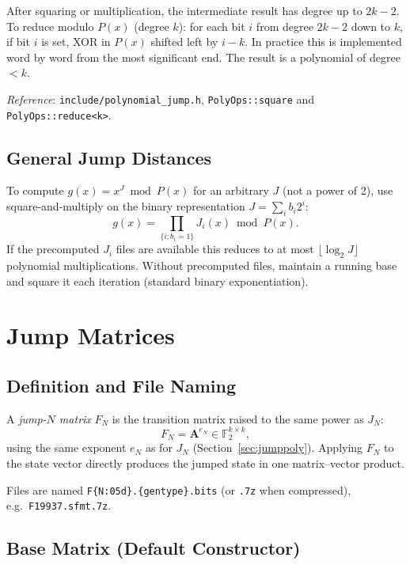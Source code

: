 \documentclass{article}
\begin{document}
After squaring or multiplication, the intermediate result has degree up to $2k-2$.
To reduce modulo $P(x)$ (degree $k$): for each bit $i$ from degree $2k-2$ down to $k$,
if bit $i$ is set, XOR in $P(x)$ shifted left by $i-k$.  In practice this is implemented
word by word from the most significant end.  The result is a polynomial of degree $< k$.

\noindent\textit{Reference}: \texttt{include/polynomial\_jump.h}, \texttt{PolyOps::square}
and \texttt{PolyOps::reduce<k>}.

\subsection{General Jump Distances}

To compute $g(x) = x^J \bmod P(x)$ for an arbitrary $J$ (not a power of 2), use
square-and-multiply on the binary representation $J = \sum_{i} b_i 2^i$:
\begin{equation}
  g(x) = \prod_{\{i : b_i = 1\}} J_i(x) \bmod P(x).
\end{equation}
If the precomputed $J_i$ files are available this reduces to at most $\lfloor\log_2 J\rfloor$
polynomial multiplications.  Without precomputed files, maintain a running base and square
it each iteration (standard binary exponentiation).

\section{Jump Matrices}
\label{sec:jumpmat}

\subsection{Definition and File Naming}

A \emph{jump-$N$ matrix} $F_N$ is the transition matrix raised to the same power as $J_N$:
\begin{equation}
  F_N = \mathbf{A}^{e_N} \in \mathbb{F}_2^{k \times k},
\end{equation}
using the same exponent $e_N$ as for $J_N$ (Section~\ref{sec:jumppoly}).  Applying $F_N$
to the state vector directly produces the jumped state in one matrix--vector product.

Files are named \texttt{F\{N:05d\}.\{gentype\}.bits} (or \texttt{.7z} when compressed),
e.g.\ \texttt{F19937.sfmt.7z}.

\subsection{Base Matrix (Default Constructor)}
\end{document}

